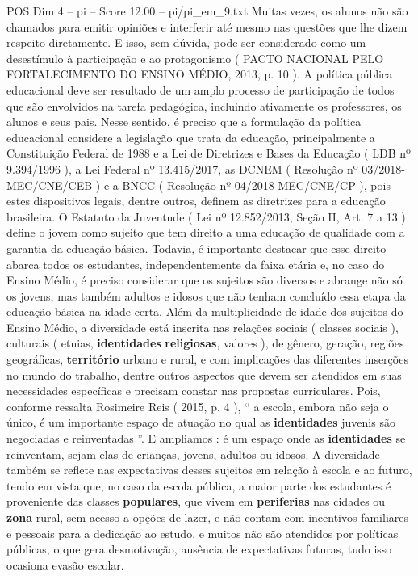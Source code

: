 \begin{textsample}{POS Dim 4 – pi – Score 12.00 – pi/pi\_em\_9.txt}
Muitas vezes, os alunos não são chamados para emitir opiniões e interferir até mesmo nas questões que lhe dizem respeito diretamente.
E isso, sem dúvida, pode ser considerado como um desestímulo à participação e ao protagonismo ( PACTO NACIONAL PELO FORTALECIMENTO DO ENSINO MÉDIO, 2013, p. 10 ).
A política pública educacional deve ser resultado de um amplo processo de participação de todos que são envolvidos na tarefa pedagógica, incluindo ativamente os professores, os alunos e seus pais.
Nesse sentido, é preciso que a formulação da política educacional considere a legislação que trata da educação, principalmente a Constituição Federal de 1988 e a Lei de Diretrizes e Bases da Educação ( LDB nº 9.394/1996 ), a Lei Federal nº 13.415/2017, as DCNEM ( Resolução nº 03/2018-MEC/CNE/CEB ) e a BNCC ( Resolução nº 04/2018-MEC/CNE/CP ), pois estes dispositivos legais, dentre outros, definem as diretrizes para a educação brasileira.
O Estatuto da Juventude ( Lei nº 12.852/2013, Seção II, Art. 7 a 13 ) define o jovem como sujeito que tem direito a uma educação de qualidade com a garantia da educação básica.
Todavia, é importante destacar que esse direito abarca todos os estudantes, independentemente da faixa etária e, no caso do Ensino Médio, é preciso considerar que os sujeitos são diversos e abrange não só os jovens, mas também adultos e idosos que não tenham concluído essa etapa da educação básica na idade certa.
Além da multiplicidade de idade dos sujeitos do Ensino Médio, a diversidade está inscrita nas relações sociais ( classes sociais ), culturais ( etnias, \textbf{identidades} \textbf{religiosas}, valores ), de gênero, geração, regiões geográficas, \textbf{território} urbano e rural, e com implicações das diferentes inserções no mundo do trabalho, dentre outros aspectos que devem ser atendidos em suas necessidades específicas e precisam constar nas propostas curriculares.
Pois, conforme ressalta Rosimeire Reis ( 2015, p. 4 ), “ a escola, embora não seja o único, é um importante espaço de atuação no qual as \textbf{identidades} juvenis são negociadas e reinventadas ”.
E ampliamos : é um espaço onde as \textbf{identidades} se reinventam, sejam elas de crianças, jovens, adultos ou idosos.
A diversidade também se reflete nas expectativas desses sujeitos em relação à escola e ao futuro, tendo em vista que, no caso da escola pública, a maior parte dos estudantes é proveniente das classes \textbf{populares}, que vivem em \textbf{periferias} nas cidades ou \textbf{zona} rural, sem acesso a opções de lazer, e não contam com incentivos familiares e pessoais para a dedicação ao estudo, e muitos não são atendidos por políticas públicas, o que gera desmotivação, ausência de expectativas futuras, tudo isso ocasiona evasão escolar.

\end{textsample}
